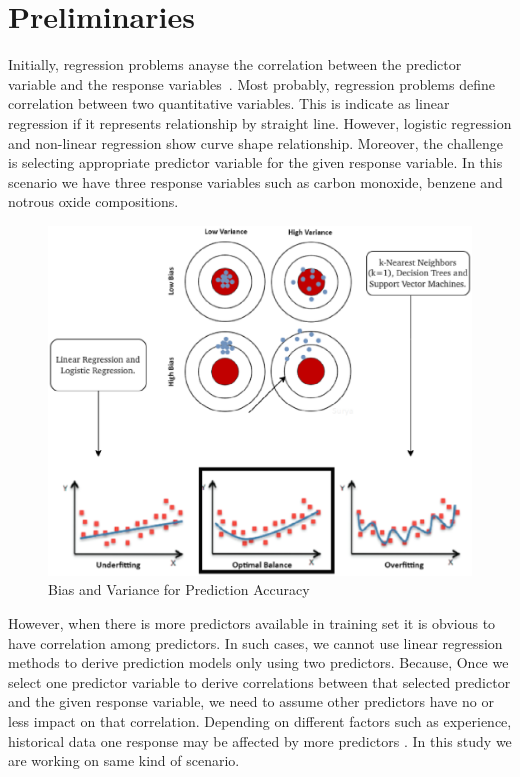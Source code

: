 


\section{Preliminaries} \label{sec-preliminaries}

Initially, regression problems 
anayse the correlation between 
the predictor variable and the response variables~\cite{uyanik2013study}.
Most probably, regression problems define correlation 
between two quantitative variables.
This is indicate as linear regression if it represents 
relationship by straight line. 
However, logistic regression and non-linear regression show curve shape relationship. 
Moreover, the challenge is 
selecting appropriate predictor 
variable for the given response variable. 
In this scenario we have three 
response variables such as 
carbon monoxide, benzene and notrous oxide compositions.

\begin{figure}
  \centering
 \includegraphics[width=0.8\linewidth,height=0.7\linewidth]{graphics//Bias_and_VrarianceAll.eps}
  \caption{Bias and Variance for Prediction Accuracy} \label{Bias_and_VrarianceAl}
\end{figure}

However, when there is more predictors available in training set it is obvious to have correlation among predictors. 
In such cases, we cannot use linear regression methods to 
derive prediction models only using two predictors.
Because, Once we select one predictor variable to derive 
correlations between that 
selected predictor and the given response variable, we need to 
assume other predictors have no or less impact on that correlation.
Depending on different factors such as experience, historical 
data one response may be affected by more predictors \cite{seber2012linear}. 
In this study we are working on same kind of scenario.

